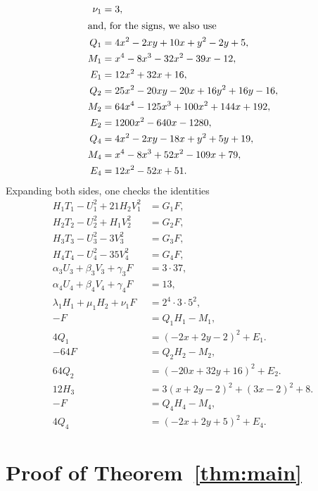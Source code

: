 \documentclass[11pt]{article}
\begin{document}
\begin{align*}
\nu_{1}&=3,\\
\intertext{and, for the signs, we also use}
Q_{1}&=4x^{2}-2xy+10x+y^{2}-2y+5,\\
M_{1}&=x^{4}-8x^{3}-32x^{2}-39x-12,\\
E_{1}&=12x^{2}+32x+16,\\
Q_{2}&=25x^{2}-20xy-20x+16y^{2}+16y-16,\\
M_{2}&=64x^{4}-125x^{3}+100x^{2}+144x+192,\\
E_{2}&=1200x^{2}-640x-1280,\\
Q_{4}&=4x^{2}-2xy-18x+y^{2}+5y+19,\\
M_{4}&=x^{4}-8x^{3}+52x^{2}-109x+79,\\
E_{4}&=12x^{2}-52x+51.
\end{align*}
Expanding both sides, one checks the identities
\begin{align}
H_{1}T_{1}-U_{1}^2+21H_{2}V_{1}^2&=G_{1}F,\label{eq:norm1}\\
H_{2}T_{2}-U_{2}^2+H_{1}V_{2}^2&=G_{2}F,\label{eq:norm2}\\
H_{3}T_{3}-U_{3}^2-3V_{3}^2&=G_{3}F,\label{eq:norm3}\\
H_{4}T_{4}-U_{4}^2-35V_{4}^2&=G_{4}F,\label{eq:norm4}\\
\alpha_{3}U_{3}+\beta_{3}V_{3}+\gamma_{3}F&=3\cdot 37,\label{eq:bez3}\\
\alpha_{4}U_{4}+\beta_{4}V_{4}+\gamma_{4}F&=13,\label{eq:bez4}\\
\lambda_{1}H_{1}+\mu_{1}H_{2}+\nu_{1}F&=2^{4}\cdot 3\cdot 5^{2},\label{eq:cross1}\\
-F&=Q_{1}H_{1}-M_{1},\label{eq:sign1}\\
4Q_{1}&=(-2x+2y-2)^2+E_{1}.\label{eq:sign1b}\\
-64F&=Q_{2}H_{2}-M_{2},\label{eq:sign2}\\
64Q_{2}&=(-20x+32y+16)^2+E_{2}.\label{eq:sign2b}\\
12H_{3}&=3(x+2y-2)^2+(3x-2)^2+8.\label{eq:sign3}\\
-F&=Q_{4}H_{4}-M_{4},\label{eq:sign4}\\
4Q_{4}&=(-2x+2y+5)^2+E_{4}.\label{eq:sign4b}
\end{align}

\section{Proof of Theorem~\ref{thm:main}}
\end{document}
